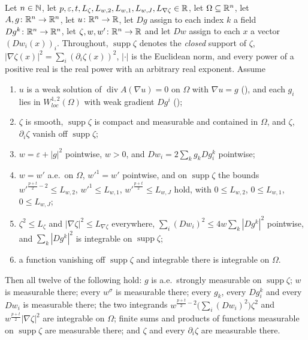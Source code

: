 \begin{helper}
Let $n\in\mathbb{N}$, let
$p,\varepsilon,t,L_\zeta,L_{w,2},L_{w,1},L_{w,J},L_{\nabla\zeta}\in\mathbb{R}$, let
$\Omega\subseteq\mathbb{R}^n$, let $A,g\colon\mathbb{R}^n\to\mathbb{R}^n$, let $u\colon\mathbb{R}^n\to\mathbb{R}$, let
$Dg$ assign to each index $k$ a field $Dg^k\colon\mathbb{R}^n\to\mathbb{R}^n$, let
$\zeta,w,w'\colon\mathbb{R}^n\to\mathbb{R}$ and let $Dw$ assign to each $x$ a vector
$(Dw_i(x))_i$.  Throughout, $\operatorname{supp}\zeta$ denotes the
\emph{closed} support of $\zeta$,
$|\nabla\zeta(x)|^2=\sum_i(\partial_i\zeta(x))^2$, $|\cdot|$ is the Euclidean
norm, and every power of a positive real is the real power with an arbitrary
real exponent.  Assume
\begin{enumerate}
\item[(H1)] $u$ is a weak solution of $\operatorname{div}A(\nabla u)=0$ on
  $\Omega$ with $\nabla u=g$ (), and each $g_i$ lies
  in $W^{1,2}_{loc}(\Omega)$ with weak gradient $Dg^i$
  ();
\item[(H2)] $\zeta$ is smooth, $\operatorname{supp}\zeta$ is compact and
  measurable and contained in $\Omega$, and $\zeta$, $\partial_i\zeta$ vanish
  off $\operatorname{supp}\zeta$;
\item[(H3)] $w=\varepsilon+|g|^2$ pointwise, $w>0$, and
  $Dw_i=2\sum_kg_kDg^k_i$ pointwise;
\item[(H4)] $w=w'$ a.e.\ on $\Omega$, $w'^1=w'$ pointwise, and on
  $\operatorname{supp}\zeta$ the bounds
  $w'^{\frac{p+t}2-2}\le L_{w,2}$, $w'^1\le L_{w,1}$,
  $w'^{\frac{p+t}2}\le L_{w,J}$ hold, with
  $0\le L_{w,2}$, $0\le L_{w,1}$, $0\le L_{w,J}$;
\item[(H5)] $\zeta^2\le L_\zeta$ and $|\nabla\zeta|^2\le L_{\nabla\zeta}$
  everywhere, $\sum_i(Dw_i)^2\le4w\sum_k|Dg^k|^2$ pointwise, and
  $\sum_k|Dg^k|^2$ is integrable on $\operatorname{supp}\zeta$;
\item[(H6)] a function vanishing off $\operatorname{supp}\zeta$ and integrable
  there is integrable on $\Omega$.
\end{enumerate}
Then all twelve of the following hold: $g$ is a.e.\ strongly measurable on
$\operatorname{supp}\zeta$; $w$ is measurable there; every $w^\sigma$ is
measurable there; every $g_k$, every $Dg^k_i$ and every $Dw_i$ is measurable
there; the two integrands
$w^{\frac{p+t}2-2}\bigl(\sum_i(Dw_i)^2\bigr)\zeta^2$ and
$w^{\frac{p+t}2}|\nabla\zeta|^2$ are integrable on $\Omega$; finite sums and
products of functions measurable on $\operatorname{supp}\zeta$ are measurable
there; and $\zeta$ and every $\partial_i\zeta$ are measurable there.
\end{helper}
